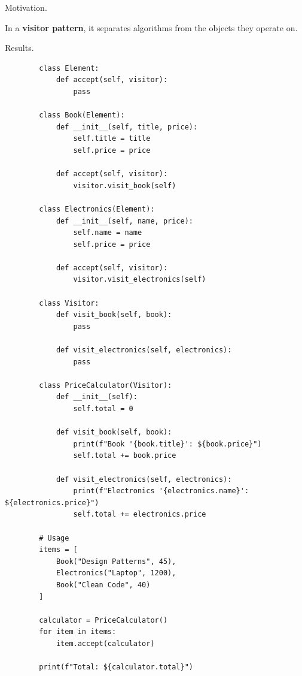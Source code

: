    Motivation. 

    \begin{definition}
      \label{def:visitor-pattern}
      In a \textbf{visitor pattern}, it separates algorithms from the objects they operate on. 
    \end{definition}

    Results. 

    \begin{example}
      \label{ex:case-study-13}
      \begin{lstlisting}
        class Element:
            def accept(self, visitor):
                pass

        class Book(Element):
            def __init__(self, title, price):
                self.title = title
                self.price = price
            
            def accept(self, visitor):
                visitor.visit_book(self)

        class Electronics(Element):
            def __init__(self, name, price):
                self.name = name
                self.price = price
            
            def accept(self, visitor):
                visitor.visit_electronics(self)

        class Visitor:
            def visit_book(self, book):
                pass
            
            def visit_electronics(self, electronics):
                pass

        class PriceCalculator(Visitor):
            def __init__(self):
                self.total = 0
            
            def visit_book(self, book):
                print(f"Book '{book.title}': ${book.price}")
                self.total += book.price
            
            def visit_electronics(self, electronics):
                print(f"Electronics '{electronics.name}': ${electronics.price}")
                self.total += electronics.price

        # Usage
        items = [
            Book("Design Patterns", 45),
            Electronics("Laptop", 1200),
            Book("Clean Code", 40)
        ]

        calculator = PriceCalculator()
        for item in items:
            item.accept(calculator)

        print(f"Total: ${calculator.total}") 
      \end{lstlisting}
    \end{example}

